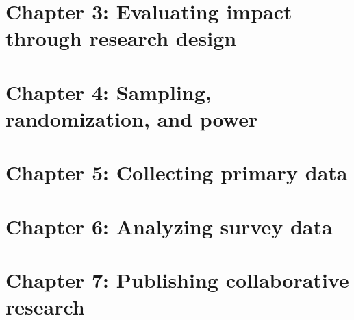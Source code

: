 \chapter{Chapter 3: Evaluating impact through research design}
\label{ch:3}




\chapter{Chapter 4: Sampling, randomization, and power}
\label{ch:4}




\chapter{Chapter 5: Collecting primary data}
\label{ch:5}




\chapter{Chapter 6: Analyzing survey data}
\label{ch:6}




\chapter{Chapter 7: Publishing collaborative research}
\label{ch:7}



